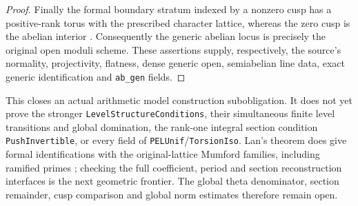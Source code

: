 \begin{proof}
Finally the formal boundary stratum indexed by a nonzero cusp has a
positive-rank torus with the prescribed character lattice, whereas
the zero cusp is the abelian interior
\cite[Theorem 6.1(3)--(4)]{integral-pel-projective}
\cite[Section 6.2.5]{integral-pel-lan}.
Consequently the generic abelian locus is precisely the original
open moduli scheme.  These assertions supply, respectively, the
source's normality, projectivity, flatness, dense generic open,
semiabelian line data, exact generic identification and
\texttt{ab\_gen} fields.
\end{proof}

This closes an actual arithmetic model construction subobligation.
It does not yet prove the stronger \texttt{LevelStructureConditions},
their simultaneous finite level transitions and global domination,
the rank-one integral section condition \texttt{PushInvertible}, or
every field of \texttt{PELUnif}/\texttt{TorsionIso}.  Lan's theorem
does give formal identifications with the original-lattice Mumford
families, including ramified primes
\cite[Theorem 11.2]{integral-pel-ramified}; checking the full coefficient,
period and section reconstruction interfaces is the next geometric
frontier.  The global theta denominator, section remainder, cusp
comparison and global norm estimates therefore remain open.
